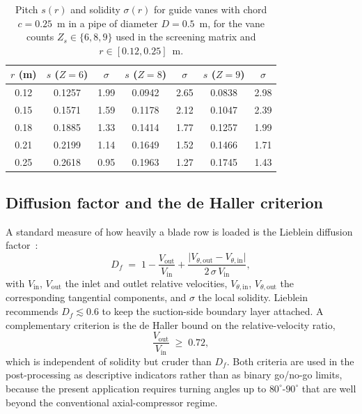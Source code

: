 \begin{table}[h!]
\centering
\caption[Pitch and solidity for selected vane counts]{Pitch $s(r)$ and solidity $\sigma(r)$ for guide vanes with chord $c = 0.25$~m in a pipe of diameter $D = 0.5$~m, for the vane counts $Z_s \in \{6,8,9\}$ used in the screening matrix and $r \in [0.12, 0.25]$~m.}
\label{tab:pitch_solidity_design}
\small
\begin{tabular}{c|cc|cc|cc}
\toprule
\textbf{$r$ (m)} & $s$ ($Z{=}6$) & $\sigma$ & $s$ ($Z{=}8$) & $\sigma$ & $s$ ($Z{=}9$) & $\sigma$ \\
\midrule
0.12 & 0.1257 & 1.99 & 0.0942 & 2.65 & 0.0838 & 2.98 \\
0.15 & 0.1571 & 1.59 & 0.1178 & 2.12 & 0.1047 & 2.39 \\
0.18 & 0.1885 & 1.33 & 0.1414 & 1.77 & 0.1257 & 1.99 \\
0.21 & 0.2199 & 1.14 & 0.1649 & 1.52 & 0.1466 & 1.71 \\
0.25 & 0.2618 & 0.95 & 0.1963 & 1.27 & 0.1745 & 1.43 \\
\bottomrule
\end{tabular}
\end{table}
 
\subsection{Diffusion factor and the de Haller criterion}
\label{sec:theory_diffusion}
 
A standard measure of how heavily a blade row is loaded is the Lieblein diffusion factor~\cite{Lieblein1953}:
\begin{equation}
D_f \;=\; 1 - \frac{V_{\mathrm{out}}}{V_{\mathrm{in}}}
       + \frac{\lvert V_{\theta,\mathrm{out}} - V_{\theta,\mathrm{in}} \rvert}
              {2\,\sigma\, V_{\mathrm{in}}},
\label{eq:Df}
\end{equation}
with $V_{\mathrm{in}}$, $V_{\mathrm{out}}$ the inlet and outlet relative velocities, $V_{\theta,\mathrm{in}}$, $V_{\theta,\mathrm{out}}$ the corresponding tangential components, and $\sigma$ the local solidity. Lieblein recommends $D_f \lesssim 0.6$ to keep the suction-side boundary layer attached. A complementary criterion is the de Haller bound on the relative-velocity ratio,
\begin{equation}
\frac{V_{\mathrm{out}}}{V_{\mathrm{in}}} \;\geq\; 0.72,
\label{eq:deHaller}
\end{equation}
which is independent of solidity but cruder than $D_f$. Both criteria are used in the post-processing as descriptive indicators rather than as binary go/no-go limits, because the present application requires turning angles up to $80^\circ$-$90^\circ$ that are well beyond the conventional axial-compressor regime.
 
